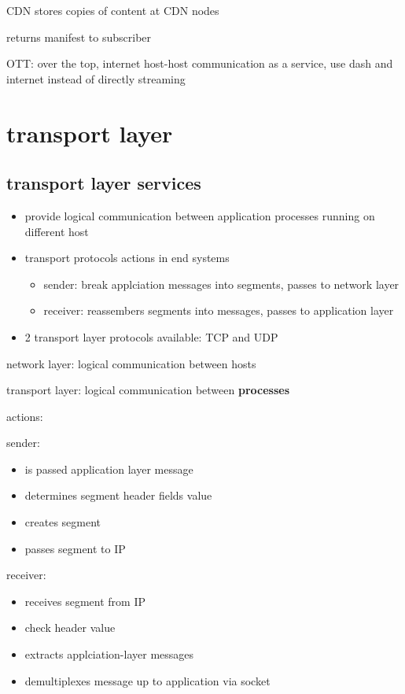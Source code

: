 \documentclass[10pt]{article}
\theoremstyle{break}
\begin{document}
CDN stores copies of content at CDN nodes 

returns manifest to subscriber 

OTT: over the top, internet host-host communication as a service, use dash and internet instead of directly streaming


\section{transport layer}
\subsection{transport layer services}
\begin{itemize}
    \item  provide logical communication between application processes running on different host
    \item transport protocols actions in end systems \begin{itemize}
        \item sender: break applciation messages into segments, passes to network layer 
        \item receiver: reassembers segments into messages, passes to application layer
    \end{itemize}
    \item 2 transport layer protocols available: TCP and UDP
\end{itemize}

network layer: logical communication between hosts 

transport layer: logical communication between \textbf{processes}

actions: 

sender:
\begin{itemize}
    \item is passed application layer message 
    \item determines segment header fields value 
    \item creates segment 
    \item passes segment to IP 
\end{itemize}

receiver: 
\begin{itemize}
    \item receives segment from IP 
    \item check header value 
    \item extracts applciation-layer messages 
    \item demultiplexes message up to application via socket
\end{itemize}
\end{document}
